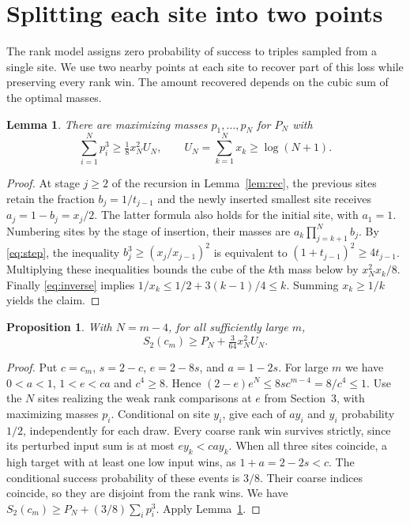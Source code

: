 \documentclass[11pt,reqno]{amsart}
\newtheorem{proposition}[theorem]{Proposition}
\newtheorem{lemma}[theorem]{Lemma}
\begin{document}
\section{Splitting each site into two points}\label{sec:split}
The rank model assigns zero probability of success to triples sampled
from a single site. We use two nearby points at each site to recover
part of this loss while preserving every rank win. The amount
recovered depends on the cubic sum of the optimal masses.

\begin{lemma}\label{lem:cubic}
There are maximizing masses $p_1,\ldots,p_N$ for $P_N$ with
\[
 \sum_{i=1}^N p_i^3\ge \tfrac18 x_N^2 U_N,\qquad
 U_N=\sum_{k=1}^N x_k\ge\log(N+1).
\]
\end{lemma}
\begin{proof}
At stage $j\ge2$ of the recursion in Lemma~\ref{lem:rec}, the
previous sites retain the fraction $b_j=1/t_{j-1}$ and the newly
inserted smallest site receives $a_j=1-b_j=x_j/2$. The latter formula
also holds for the initial site, with $a_1=1$. Numbering sites by the
stage of insertion, their masses are $a_k\prod_{j=k+1}^N b_j$.
By \eqref{eq:step}, the inequality $b_j^3\ge(x_j/x_{j-1})^2$
is equivalent to $(1+t_{j-1})^2\ge4t_{j-1}$. Multiplying these
inequalities bounds the cube of the $k$th mass below by
$x_N^2 x_k/8$. Finally \eqref{eq:inverse} implies
$1/x_k\le1/2+3(k-1)/4\le k$. Summing $x_k\ge1/k$ yields the claim.
\end{proof}

\begin{proposition}\label{prop:split}
With $N=m-4$, for all sufficiently large $m$,
\begin{equation}\label{eq:split}
 S_2(c_m)\ge P_N+\tfrac3{64}x_N^2 U_N .
\end{equation}
\end{proposition}
\begin{proof}
Put $c=c_m$, $s=2-c$, $e=2-8s$, and $a=1-2s$.
For large $m$ we have $0<a<1$, $1<e<ca$ and $c^4\ge8$. Hence
$(2-e)e^N\le8s c^{m-4}=8/c^4\le1$.
Use the $N$ sites realizing the weak rank comparisons at $e$ from
Section~3, with maximizing masses $p_i$. Conditional on site $y_i$,
give each of $ay_i$ and $y_i$ probability $1/2$, independently for
each draw. Every coarse rank win survives strictly, since its perturbed
input sum is at most $ey_k<cay_k$. When all three sites coincide,
a high target with at least one low input wins, as $1+a=2-2s<c$.
The conditional success probability of these events is $3/8$.
Their coarse indices coincide, so they are disjoint from the rank wins.
We have $S_2(c_m)\ge P_N+(3/8)\sum_i p_i^3$. Apply Lemma~\ref{lem:cubic}.
\end{proof}
\end{document}
